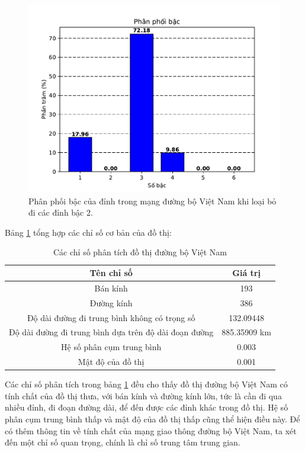 \documentclass[14pt, oneside, a4paper, openany]{scrartcl}
\begin{document}
\begin{figure}[!h]
	\centering
	\includegraphics[scale=0.9]{figures/degreedist3.pdf} 
	\caption[Phân phối bậc của đỉnh trong mạng đường bộ Việt Nam khi loại bỏ đi các đỉnh bậc 2]{Phân phối bậc của đỉnh trong mạng đường bộ Việt Nam khi loại bỏ đi các đỉnh bậc 2.}
	\label{fig:degreedist2}
\end{figure}

Bảng \ref{table:measures} tổng hợp các chỉ số cơ bản của đồ thị:
\begin{table}[!h]
	\caption[Các chỉ số phân tích đồ thị đường bộ Việt Nam]{Các chỉ số phân tích đồ thị đường bộ Việt Nam}
	\centering
	\begin{tabular}{ |c|c| } 
		\hline
		Tên chỉ số & Giá trị \\ 
		\hline
		 Bán kính & 193\\
		 Đường kính & 386\\ 
		 Độ dài đường đi trung bình không có trọng số & 132.09448\\
		 Độ dài đường đi trung bình dựa trên độ dài đoạn đường & 885.35909 km\\ 
		 Hệ số phân cụm trung bình & 0.003\\
		 Mật độ của đồ thị & 0.001\\ 
		\hline
	\end{tabular}
	\label{table:measures}
\end{table}

Các chỉ số phân tích trong bảng \ref{table:measures} đều cho thấy đồ thị đường bộ Việt Nam có tính chất của đồ thị thưa, với bán kính và đường kính lớn, tức là cần đi qua nhiều đỉnh, đi đoạn đường dài, để đến được các đỉnh khác trong đồ thị. Hệ số phân cụm trung bình thấp và mật độ của đồ thị thấp cũng thể hiện điều này.
Để có thêm thông tin về tính chất của mạng giao thông đường bộ Việt Nam, ta xét đến một chỉ số quan trọng, chính là chỉ số trung tâm trung gian.
\end{document}
